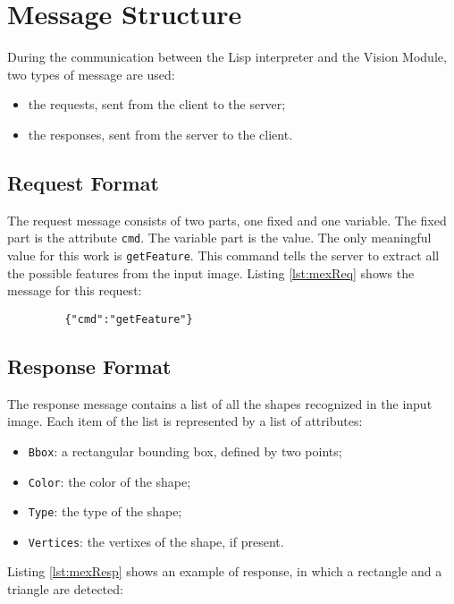 
\lstset{breaklines=true, basicstyle=\small\ttfamily, columns=fullflexible, keepspaces=true,stepnumber=2}


	
	\section{Message Structure}\label{appB}
	During the communication between the \mbox{Lisp} interpreter and the Vision Module, two types of message are used:
	\begin{itemize}
		\item the requests, sent from the client to the server;
		\item the responses, sent from the server to the client.
	\end{itemize}
	 
	\subsection{Request Format}
		The request message consists of two parts, one fixed and one variable.
		The fixed part is the attribute \lstinline!cmd!. 
		The variable part is the value. 
		The only meaningful value for this work is \lstinline!getFeature!.
		This command tells the server to extract all the possible features from the input image.
		Listing \ref{lst:mexReq} shows the message for this request:
	
		\begin{lstlisting}
		 {"cmd":"getFeature"}		\end{lstlisting}
	

	\subsection{Response Format}
		The response message contains a list of all the shapes recognized in the input image.
		Each item of the list is represented by a list of attributes:
		\begin{itemize}
			\item \lstinline!Bbox!: a rectangular bounding box, defined by two points;
			\item \lstinline!Color!: the color of the shape;
			\item \lstinline!Type!: the type of the shape;
			\item \lstinline!Vertices!: the vertixes of the shape, if present.
		\end{itemize}
		Listing \ref{lst:mexResp} shows an example of response, in which a rectangle and a triangle are detected:

